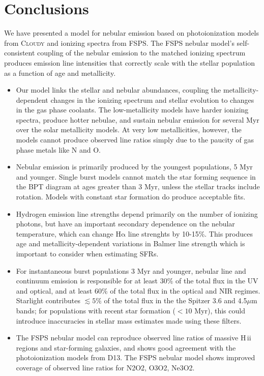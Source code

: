 \documentclass[trackchanges, twocolumn, tighten]{aastex61}
\newcommand{\FSPS}{{\sc FSPS}\xspace}
\newcommand{\Cloudy}{\textsc{Cloudy}\xspace}
\newcommand{\ha}{\ensuremath{\mathrm{H\alpha}}}
\newcommand{\hii}{H\,{\sc ii}\xspace}
\begin{document}
\section{Conclusions}\label{sec:conclusions}

We have presented a model for nebular emission based on photoionization models from \Cloudy and ionizing spectra from \FSPS. The \FSPS nebular model's self-consistent coupling of the nebular emission to the matched ionizing spectrum produces emission line intensities that correctly scale with the stellar population as a function of age and metallicity.

\begin{itemize}
\item Our model links the stellar and nebular abundances, coupling the metallicity-dependent changes in the ionizing spectrum and stellar evolution to changes in the gas phase coolants. The low-metallicity models have harder ionizing spectra, produce hotter nebulae, and sustain nebular emission for several Myr over the solar metallicity models. At very low metallicities, however, the models cannot produce observed line ratios simply due to the paucity of gas phase metals like N and O.
\item Nebular emission is primarily produced by the youngest populations, 5 Myr and younger. Single burst models cannot match the star forming sequence in the BPT diagram at ages greater than 3 Myr, unless the stellar tracks include rotation. Models with constant star formation do produce acceptable fits.
\item Hydrogen emission line strengths depend primarily on the number of ionizing photons, but have an important secondary dependence on the nebular temperature, which can change \ha{} line strenghts by 10-15\%. This produces age and metallicity-dependent variations in Balmer line strength which is important to consider when estimating SFRs.
\item For instantaneous burst populations 3 Myr and younger, nebular line and continuum emission is responsible for at least $30\%$ of the total flux in the UV and optical, and at least $60\%$ of the total flux in the optical and NIR regimes. Starlight contributes $\lesssim5\%$ of the total flux in the the Spitzer 3.6 and 4.5$\mu$m bands; for populations with recent star formation ($<10$ Myr), this could introduce inaccuracies in stellar mass estimates made using these filters.
\item The \FSPS nebular model can reproduce observed line ratios of massive \hii regions and star-forming galaxies, and shows good agreement with the photoionization models from D13. The FSPS nebular model shows improved coverage of observed line ratios for N2O2, O3O2, Ne3O2.

\end{itemize}
\end{document}
